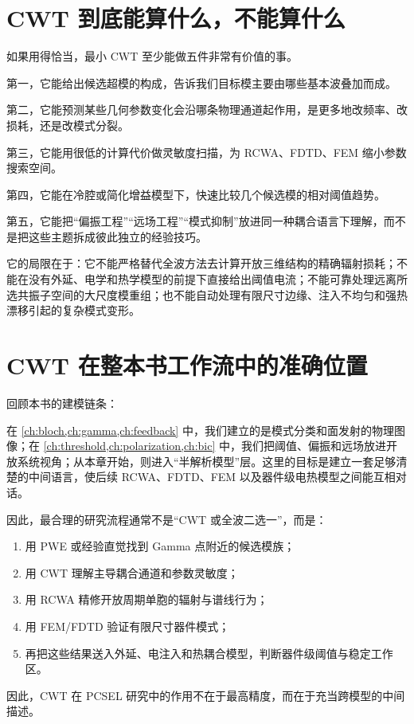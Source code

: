 \section{CWT 到底能算什么，不能算什么}
如果用得恰当，最小 CWT 至少能做五件非常有价值的事。

第一，它能给出候选超模的构成，告诉我们目标模主要由哪些基本波叠加而成。

第二，它能预测某些几何参数变化会沿哪条物理通道起作用，是更多地改频率、改损耗，还是改模式分裂。

第三，它能用很低的计算代价做灵敏度扫描，为 RCWA、FDTD、FEM 缩小参数搜索空间。

第四，它能在冷腔或简化增益模型下，快速比较几个候选模的相对阈值趋势。

第五，它能把“偏振工程”“远场工程”“模式抑制”放进同一种耦合语言下理解，而不是把这些主题拆成彼此独立的经验技巧。

它的局限在于：它不能严格替代全波方法去计算开放三维结构的精确辐射损耗；不能在没有外延、电学和热学模型的前提下直接给出阈值电流；不能可靠处理远离所选共振子空间的大尺度模重组；也不能自动处理有限尺寸边缘、注入不均匀和强热漂移引起的复杂模式变形。

\section{CWT 在整本书工作流中的准确位置}
回顾本书的建模链条：

在 \cref{ch:bloch,ch:gamma,ch:feedback} 中，我们建立的是模式分类和面发射的物理图像；在 \cref{ch:threshold,ch:polarization,ch:bic} 中，我们把阈值、偏振和远场放进开放系统视角；从本章开始，则进入“半解析模型”层。这里的目标是建立一套足够清楚的中间语言，使后续 RCWA、FDTD、FEM 以及器件级电热模型之间能互相对话。

因此，最合理的研究流程通常不是“CWT 或全波二选一”，而是：
\begin{enumerate}
  \item 用 PWE 或经验直觉找到 Gamma 点附近的候选模族；
  \item 用 CWT 理解主导耦合通道和参数灵敏度；
  \item 用 RCWA 精修开放周期单胞的辐射与谱线行为；
  \item 用 FEM/FDTD 验证有限尺寸器件模式；
  \item 再把这些结果送入外延、电注入和热耦合模型，判断器件级阈值与稳定工作区。
\end{enumerate}

因此，CWT 在 PCSEL 研究中的作用不在于最高精度，而在于充当跨模型的中间描述。

